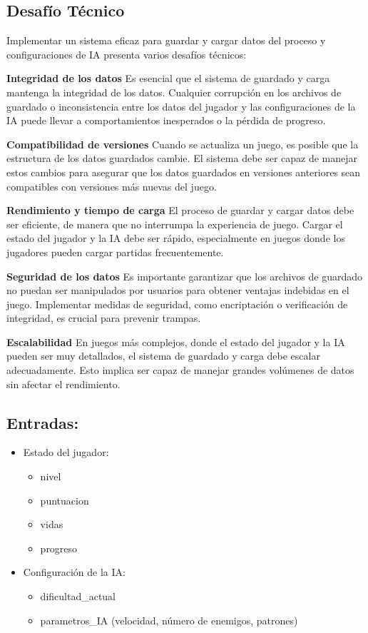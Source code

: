 \subsection*{Desafío Técnico}
Implementar un sistema eficaz para guardar y cargar datos del proceso y configuraciones de IA presenta varios desafíos técnicos:

\textbf{Integridad de los datos}
Es esencial que el sistema de guardado y carga mantenga la integridad de los datos. Cualquier corrupción en los archivos de guardado o inconsistencia entre los datos del jugador y las configuraciones de la IA puede llevar a comportamientos inesperados o la pérdida de progreso.

\textbf{Compatibilidad de versiones}
Cuando se actualiza un juego, es posible que la estructura de los datos guardados cambie. El sistema debe ser capaz de manejar estos cambios para asegurar que los datos guardados en versiones anteriores sean compatibles con versiones más nuevas del juego.

\textbf{Rendimiento y tiempo de carga}
El proceso de guardar y cargar datos debe ser eficiente, de manera que no interrumpa la experiencia de juego. Cargar el estado del jugador y la IA debe ser rápido, especialmente en juegos donde los jugadores pueden cargar partidas frecuentemente.

\textbf{Seguridad de los datos}
Es importante garantizar que los archivos de guardado no puedan ser manipulados por usuarios para obtener ventajas indebidas en el juego. Implementar medidas de seguridad, como encriptación o verificación de integridad, es crucial para prevenir trampas.

\textbf{Escalabilidad}
En juegos más complejos, donde el estado del jugador y la IA pueden ser muy detallados, el sistema de guardado y carga debe escalar adecuadamente. Esto implica ser capaz de manejar grandes volúmenes de datos sin afectar el rendimiento.


\subsection*{Entradas:}
\begin{itemize}
    \item Estado del jugador:
    \begin{itemize}
        \item nivel
        \item puntuacion
        \item vidas
        \item progreso
    \end{itemize}
    \item Configuración de la IA:
    \begin{itemize}
        \item dificultad_actual
        \item parametros_IA (velocidad, número de enemigos, patrones)
    \end{itemize}
\end{itemize}

